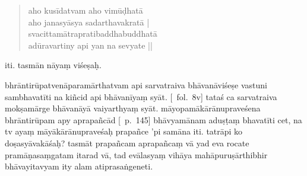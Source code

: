 \documentclass[12pt]{article}
\begin{document}
\begin{quote}
	aho kusīdatvam aho vimūḍhatā\\
	aho janasyāsya sadarthavakratā |\\
	svacittamātrapratibaddhabuddhatā\footnoteB{
		°pratibaddha°] \conj\ (\TIB; 'brel pa); °pratibuddha° \MS\ \EDD
	}\\
	adūravartiny api yan na sevyate ||
% 
% 
% 
\end{quote}

\noindent iti. tasmān nāyaṃ viśeṣaḥ.

bhrāntirūpatvenāparamārthatvam api sarvatraiva bhāvanāviśeṣe vastuni sambhavatīti na kiñcid api bhāvanīyaṃ syāt. [\MS\ fol.\ 8v] tataś ca sarvatraiva mokṣamārge bhāvanāyā vaiyarthyaṃ syāt. māyopamākārānupraveśena bhrāntirūpam apy aprapañcād [\EDD\ p.\ 145] bhāvyamānam\footnoteB{
	aprapañcād bhāvyamānam] \EDD ; aprapañcā bhāvyamāṇam
} aduṣṭaṃ bhavatīti cet, na tv ayaṃ māyākārānupraveśaḥ prapañce 'pi samāna iti. tatrāpi ko doṣasyāvakāśaḥ? tasmāt prapañcam aprapañcaṃ vā yad eva rocate pramāṇasaṃgatam itarad vā, tad evālasyaṃ vihāya mahāpuruṣārthibhir bhāvayitavyam\footnoteB{
	bhāvayitavyam] \EDD ; bhaviyitavyam \MS
} ity alam atiprasaṅgeneti.
\end{document}
